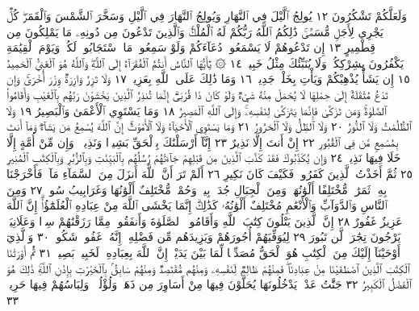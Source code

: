 وَلَعَلَّكُمْ تَشْكُرُونَ ١٢ يُولِجُ ٱلَّيْلَ فِي ٱلنَّهَارِ وَيُولِجُ
ٱلنَّهَارَ فِي ٱلَّيْلِ وَسَخَّرَ ٱلشَّمْسَ وَٱلْقَمَرَۖ كُلࣱّ يَجْرِي
لِأَجَلࣲ مُّسَمࣰّىۚ ذَٰلِكُمُ ٱللَّهُ رَبُّكُمْ لَهُ ٱلْمُلْكُۚ وَٱلَّذِينَ
تَدْعُونَ مِن دُونِهِۦ مَا يَمْلِكُونَ مِن قِطْمِيرٍ ١٣ إِن
تَدْعُوهُمْ لَا يَسْمَعُوا۟ دُعَآءَكُمْ وَلَوْ سَمِعُوا۟ مَا ٱسْتَجَابُوا۟ لَكُمْۖ
وَيَوْمَ ٱلْقِيَٰمَةِ يَكْفُرُونَ بِشِرْكِكُمْۚ وَلَا يُنَبِّئُكَ مِثْلُ خَبِيرࣲ ١٤
۞ يَٰٓأَيُّهَا ٱلنَّاسُ أَنتُمُ ٱلْفُقَرَآءُ إِلَى ٱللَّهِۖ وَٱللَّهُ هُوَ ٱلْغَنِيُّ
ٱلْحَمِيدُ ١٥ إِن يَشَأْ يُذْهِبْكُمْ وَيَأْتِ بِخَلْقࣲ جَدِيدࣲ ١٦
وَمَا ذَٰلِكَ عَلَى ٱللَّهِ بِعَزِيزࣲ ١٧ وَلَا تَزِرُ وَازِرَةࣱ وِزْرَ أُخْرَىٰۚ وَإِن
تَدْعُ مُثْقَلَةٌ إِلَىٰ حِمْلِهَا لَا يُحْمَلْ مِنْهُ شَيْءࣱ وَلَوْ كَانَ ذَا قُرْبَىٰٓۗ
إِنَّمَا تُنذِرُ ٱلَّذِينَ يَخْشَوْنَ رَبَّهُم بِٱلْغَيْبِ وَأَقَامُوا۟ ٱلصَّلَوٰةَۚ
وَمَن تَزَكَّىٰ فَإِنَّمَا يَتَزَكَّىٰ لِنَفْسِهِۦۚ وَإِلَى ٱللَّهِ ٱلْمَصِيرُ ١٨
وَمَا يَسْتَوِي ٱلْأَعْمَىٰ وَٱلْبَصِيرُ ١٩ وَلَا ٱلظُّلُمَٰتُ وَلَا ٱلنُّورُ ٢٠
وَلَا ٱلظِّلُّ وَلَا ٱلْحَرُورُ ٢١ وَمَا يَسْتَوِي ٱلْأَحْيَآءُ وَلَا
ٱلْأَمْوَٰتُۚ إِنَّ ٱللَّهَ يُسْمِعُ مَن يَشَآءُۖ وَمَآ أَنتَ بِمُسْمِعࣲ مَّن فِي
ٱلْقُبُورِ ٢٢ إِنْ أَنتَ إِلَّا نَذِيرٌ ٢٣ إِنَّآ أَرْسَلْنَٰكَ بِٱلْحَقِّ بَشِيرࣰا
وَنَذِيرࣰاۚ وَإِن مِّنْ أُمَّةٍ إِلَّا خَلَا فِيهَا نَذِيرࣱ ٢٤ وَإِن يُكَذِّبُوكَ
فَقَدْ كَذَّبَ ٱلَّذِينَ مِن قَبْلِهِمْ جَآءَتْهُمْ رُسُلُهُم بِٱلْبَيِّنَٰتِ
وَبِٱلزُّبُرِ وَبِٱلْكِتَٰبِ ٱلْمُنِيرِ ٢٥ ثُمَّ أَخَذْتُ ٱلَّذِينَ كَفَرُوا۟ۖ
فَكَيْفَ كَانَ نَكِيرِ ٢٦ أَلَمْ تَرَ أَنَّ ٱللَّهَ أَنزَلَ مِنَ ٱلسَّمَآءِ
مَآءࣰ فَأَخْرَجْنَا بِهِۦ ثَمَرَٰتࣲ مُّخْتَلِفًا أَلْوَٰنُهَاۚ وَمِنَ ٱلْجِبَالِ
جُدَدُۢ بِيضࣱ وَحُمْرࣱ مُّخْتَلِفٌ أَلْوَٰنُهَا وَغَرَابِيبُ سُودࣱ ٢٧
وَمِنَ ٱلنَّاسِ وَٱلدَّوَآبِّ وَٱلْأَنْعَٰمِ مُخْتَلِفٌ أَلْوَٰنُهُۥ كَذَٰلِكَۗ
إِنَّمَا يَخْشَى ٱللَّهَ مِنْ عِبَادِهِ ٱلْعُلَمَٰٓؤُا۟ۗ إِنَّ ٱللَّهَ عَزِيزٌ غَفُورٌ ٢٨
إِنَّ ٱلَّذِينَ يَتْلُونَ كِتَٰبَ ٱللَّهِ وَأَقَامُوا۟ ٱلصَّلَوٰةَ وَأَنفَقُوا۟ مِمَّا
رَزَقْنَٰهُمْ سِرࣰّا وَعَلَانِيَةࣰ يَرْجُونَ تِجَٰرَةࣰ لَّن تَبُورَ ٢٩ لِيُوَفِّيَهُمْ
أُجُورَهُمْ وَيَزِيدَهُم مِّن فَضْلِهِۦٓۚ إِنَّهُۥ غَفُورࣱ شَكُورࣱ ٣٠
وَٱلَّذِيٓ أَوْحَيْنَآ إِلَيْكَ مِنَ ٱلْكِتَٰبِ هُوَ ٱلْحَقُّ مُصَدِّقࣰا لِّمَا بَيْنَ
يَدَيْهِۗ إِنَّ ٱللَّهَ بِعِبَادِهِۦ لَخَبِيرُۢ بَصِيرࣱ ٣١ ثُمَّ أَوْرَثْنَا ٱلْكِتَٰبَ
ٱلَّذِينَ ٱصْطَفَيْنَا مِنْ عِبَادِنَاۖ فَمِنْهُمْ ظَالِمࣱ لِّنَفْسِهِۦ وَمِنْهُم
مُّقْتَصِدࣱ وَمِنْهُمْ سَابِقُۢ بِٱلْخَيْرَٰتِ بِإِذْنِ ٱللَّهِۚ ذَٰلِكَ هُوَ
ٱلْفَضْلُ ٱلْكَبِيرُ ٣٢ جَنَّٰتُ عَدْنࣲ يَدْخُلُونَهَا يُحَلَّوْنَ
فِيهَا مِنْ أَسَاوِرَ مِن ذَهَبࣲ وَلُؤْلُؤࣰاۖ وَلِبَاسُهُمْ فِيهَا حَرِيرࣱ ٣٣
